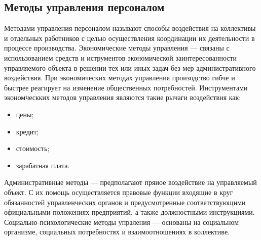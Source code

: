 \documentclass[a4paper,12pt,oneside,final]{extarticle}
\numberwithin{equation}{section}
\begin{document}
\subsection{Методы управления персоналом}
Методами управления персоналом называют способы воздействия на коллективы и отдельных работников с целью осуществления координации их деятельности в процессе производства.
Экономические методы управления --- связаны с использованием средств и иструментов экономической заинтересованности управляемого объекта в решении тех или иных задач без мер административного воздействия. 
При экономических методах управления произодство гибче и быстрее реагирует на изменение общественных потребностей. 
Инструментами экономческких методов управления являются такие рычаги воздействия как: 
\begin{itemize}
	\item цены;
	\item кредит;
	\item стоимость;
	\item зарабатная плата.
\end{itemize}
Административные методы --- предполагают пряиое воздействие на управляемый объект. 
С их помощь осуществляется правовые функции входящие в круг обязанностей управленческих органов и предусмотренные соответствующими официальными положениях предприятий, а также должностными инструкциями.
Социально-психологические методы упраления --- основаны на социальном организме, социальных потребностях и взаимоотношениях в коллективе. 
\end{document}
